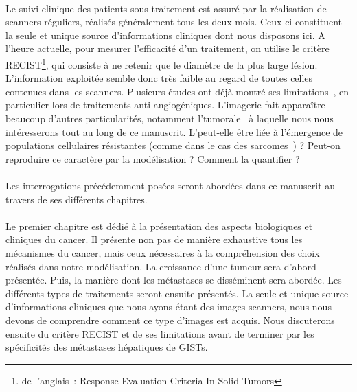 \documentclass[main.tex]{subfiles}
\begin{document}
\paragraph{}
Le suivi clinique des patients sous traitement est assuré par la réalisation de scanners réguliers, réalisés généralement tous les deux mois. Ceux-ci constituent la seule et unique source d'informations cliniques dont nous disposons ici.  
A l'heure actuelle, pour mesurer l'efficacité d'un traitement, on %
utilise le critère RECIST\footnote{de l'anglais~: Response Evaluation Criteria In Solid Tumors}, qui consiste à ne retenir %
que le diamètre de la plus large lésion. 
L'information exploitée %
semble donc très faible au regard de toutes celles contenues dans les scanners. 
Plusieurs études ont déjà montré ses limitations~\cite{benjamin2007we}, en particulier lors de traitements anti-angiogéniques. L'imagerie fait apparaître beaucoup d'autres particularités, notamment l'\hetero tumorale~\cite{heppner1984tumor,chabat2003obstructive} à laquelle nous nous intéresserons tout au long de ce manuscrit. L'\hetero peut-elle être liée à l'émergence de populations cellulaires résistantes (comme dans le cas des sarcomes~\cite{eary2008spatial}) ? Peut-on reproduire ce caractère par la modélisation ? Comment la quantifier ?



\paragraph{}
Les interrogations précédemment posées seront abordées dans ce manuscrit au travers de ses différents chapitres. 

\paragraph{}
Le premier chapitre est dédié à la présentation des aspects biologiques et cliniques du cancer.  
Il présente non pas de manière exhaustive tous les mécanismes du cancer, mais ceux nécessaires à la compréhension des choix réalisés dans notre modélisation. 
La croissance d'une tumeur sera d'abord présentée. 
Puis, la manière dont les métastases se disséminent sera abordée. Les différents types de traitements seront ensuite présentés. La seule et unique source d'informations cliniques que nous ayons étant des images scanners, nous nous devons de comprendre comment ce type d'images est acquis. Nous discuterons ensuite du critère RECIST et de ses limitations avant de terminer par les spécificités des métastases hépatiques de GISTs.
\end{document}

